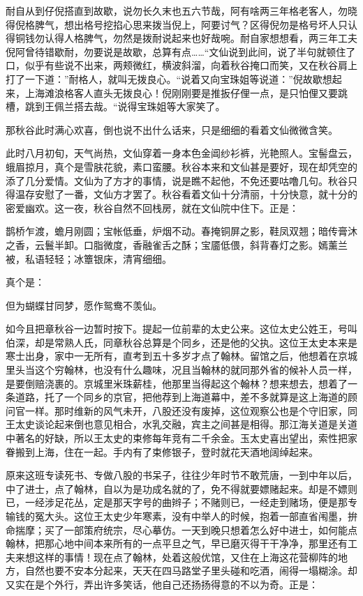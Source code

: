 \documentclass[12pt,UTF8]{ctexbook}
\begin{document}
{{{耐自从到仔倪搭直到故歇，说勿长久末也五六节哉，阿有啥两三年格老客人，勿晓得倪格脾气，想出格号挖掐心思来拨当倪上，阿要讨气？区得倪勿是格号坏人只认得铜钱勿认得人格脾气，勿然是拨耐说起来也好哉啘。耐自家想想看，两三年工夫倪阿曾待错歇耐，勿要说是故歇，总算有点……“文仙说到此间，说了半句就顿住了口，似乎有些说不出来，两颊微红，横波斜溜，向着秋谷掩口而笑，又在秋谷肩上打了一下道：”耐格人，就叫无拨良心。“说着又向宝珠姐等说道：”倪故歇想起来，上海滩浪格客人直头无拨良心！倪刚刚要是推扳仔俚一点，是只怕俚又要跳槽，跳到王佩兰搭去哉。“说得宝珠姐等大家笑了。

那秋谷此时满心欢喜，倒也说不出什么话来，只是细细的看着文仙微微含笑。

此时八月初旬，天气尚热，文仙穿着一身本色金阊纱衫裤，光艳照人。宝髻盘云，蛾眉掠月，真个是雪肤花貌，素口蛮腰。秋谷本来和文仙甚是要好，现在却凭空的添了几分爱情。文仙为了方才的事情，说是瞧不起他，不免还要咕噜几句。秋谷只得温存安慰了一番，文仙方才罢了。秋谷看着文仙十分清丽，十分快意，就十分的密爱幽欢。这一夜，秋谷自然不回栈房，就在文仙院中住下。正是：

鹊桥乍渡，蟾月刚圆；宝帐低垂，炉烟不动。春掩铜屏之影，鞋凤双翘；暗传膏沐之香，云鬟半卸。口脂微度，香融雀舌之酥；宝靥低偎，斜背春灯之影。嫣薰兰被，私语轻轻；冰簟银床，清宵细细。

真个是：

但为蝴蝶甘同梦，愿作鸳鸯不羡仙。

如今且把章秋谷一边暂时按下。提起一位前辈的太史公来。这位太史公姓王，号叫伯深，却是常熟人氏，同章秋谷总算是个同乡，还是他的父执。这位王太史本来是寒士出身，家中一无所有，直考到五十多岁才点了翰林。留馆之后，他想着在京城里头当这个穷翰林，也没有什么趣味，况且当翰林的就同那外省的候补人员一样，是要倒赔浇裹的。京城里米珠薪桂，他那里当得起这个翰林？想来想去，想着了一条道路，托了一个同乡的京官，把他荐到上海道幕中，差不多就算是这上海道的顾问官一样。那时维新的风气未开，八股还没有废掉，这位观察公也是个守旧家，同王太史谈论起来倒也意见相合，水乳交融，宾主之间甚是相得。那江海关道是关道中著名的好缺，所以王太史的束修每年竞有二千余金。玉太史喜出望出，索性把家眷搬到上海，住在一起。手内有了束修银子，登时就花天酒地阔绰起来。

原来这班专读死书、专做八股的书呆子，往往少年时节不敢荒唐，一到中年以后，中了进士，点了翰林，自以为是功成名就的了，免不得就要嫖赌起来。却是不嫖则已，一经涉足花丛，定是那天字号的曲辫子；不赌则已，一经走到赌场，便是那专输钱的冤大头。这位王太史少年寒素，没有中举人的时候，抱着一部直省闱墨，拚命揣摩；买了一部策府统宗，尽心摹仿。一天到晚只想着怎么好中进士，如何能点翰林，把那心地中间本来所有的一点平旦之气，早已磨灭得干干净净，那里还有工夫来想这样的事情！现在点了翰林，处着这般优馆，又住在上海这花营柳阵的地方，自然也要不安本分起来，天天在四马路堂子里头碰和吃酒，闹得一塌糊涂。却又实在是个外行，弄出许多笑话，他自己还扬扬得意的不以为奇。正是：

}}}
\end{document}
